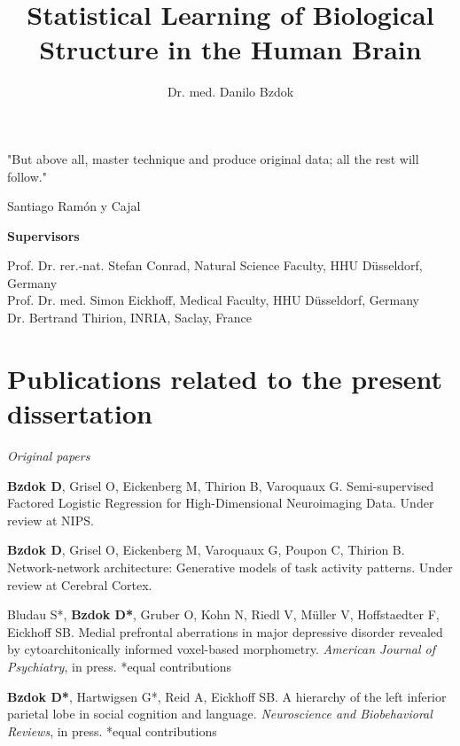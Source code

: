 \documentclass[authoryear,review,3p]{elsarticle}
\begin{document}
\begin{frontmatter}

\title{Statistical Learning of Biological Structure in the Human Brain}

\author{Dr. med. Danilo Bzdok}

\end{frontmatter}

\bigskip
\bigskip
\bigskip
\centerline{
"But above all, master technique and produce original data; 
all the rest will follow."}
\centerline{Santiago Ram\'{o}n y Cajal}

\bigskip
\bigskip
\bigskip

\textbf{Supervisors\\}

Prof. Dr. rer.-nat. Stefan Conrad, Natural Science Faculty, HHU D\"usseldorf, Germany\\

Prof. Dr. med. Simon Eickhoff, Medical Faculty, HHU D\"usseldorf, Germany\\

Dr. Bertrand Thirion, INRIA, Saclay, France\\


\bigskip

\newpage
\section*{Publications related to the present dissertation}
\linebreak
\textit{Original papers}

\textbf{Bzdok D}, Grisel O, Eickenberg M, Thirion B, Varoquaux G.
Semi-supervised Factored Logistic Regression for High-Dimensional
Neuroimaging Data. Under review at NIPS.

\textbf{Bzdok D}, Grisel O, Eickenberg M, Varoquaux G, Poupon C, Thirion B.
Network-network architecture: Generative models of task activity patterns.
Under review at Cerebral Cortex.

Bludau S*, \textbf{Bzdok D*}, Gruber O,
Kohn N, Riedl V, Müller V, Hoffstaedter F, Eickhoff SB.
Medial prefrontal aberrations in major depressive disorder
revealed by cytoarchitonically informed voxel-based morphometry.
\textit{American Journal of Psychiatry}, in press. *equal contributions

\textbf{Bzdok D*}, Hartwigsen G*, Reid A, Eickhoff SB.
A hierarchy of the left inferior parietal lobe in social cognition and
language.
\textit{Neuroscience and Biobehavioral Reviews}, in press. *equal contributions
\end{document}
